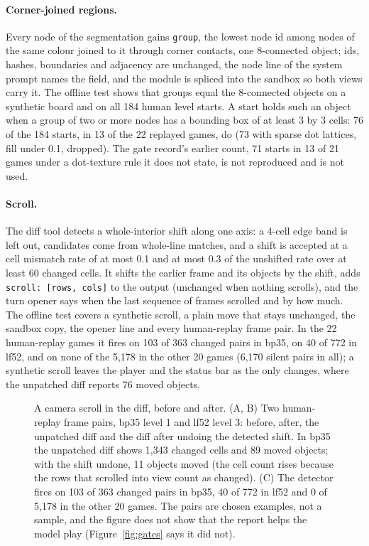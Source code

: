 \paragraph{Corner-joined regions.}
Every node of the segmentation gains \texttt{group}, the lowest node id among nodes of the same colour joined to it through corner contacts, one 8-connected object; ids, hashes, boundaries and adjacency are unchanged, the node line of the system prompt names the field, and the module is spliced into the sandbox so both views carry it. %
The offline test shows that groups equal the 8-connected objects on a synthetic board and on all 184 human level starts. %
A start holds such an object when a group of two or more nodes has a bounding box of at least 3 by 3 cells: 76 of the 184 starts, in 13 of the 22 replayed games, do (73 with sparse dot lattices, fill under 0.1, dropped). The gate record's earlier count, 71 starts in 13 of 21 games under a dot-texture rule it does not state, is not reproduced and is not used. %

\paragraph{Scroll.}
The diff tool detects a whole-interior shift along one axis: a 4-cell edge band is left out, candidates come from whole-line matches, and a shift is accepted at a cell mismatch rate of at most 0.1 and at most 0.3 of the unshifted rate over at least 60 changed cells. %
It shifts the earlier frame and its objects by the shift, adds \texttt{scroll: [rows, cols]} to the output (unchanged when nothing scrolls), and the turn opener says when the last sequence of frames scrolled and by how much. %
The offline test covers a synthetic scroll, a plain move that stays unchanged, the sandbox copy, the opener line and every human-replay frame pair. %
In the 22 human-replay games it fires on 103 of 363 changed pairs in bp35, on 40 of 772 in lf52, and on none of the 5,178 in the other 20 games (6,170 silent pairs in all); a synthetic scroll leaves the player and the status bar as the only changes, where the unpatched diff reports 76 moved objects. %

\begin{figure}[!htb]
\centering
{}
\caption{A camera scroll in the diff, before and after. (A, B) Two human-replay frame pairs, bp35 level 1 and lf52 level 3: before, after, the unpatched diff and the diff after undoing the detected shift. In bp35 the unpatched diff shows 1,343 changed cells and 89 moved objects; with the shift undone, 11 objects moved (the cell count rises because the rows that scrolled into view count as changed). (C) The detector fires on 103 of 363 changed pairs in bp35, 40 of 772 in lf52 and 0 of 5,178 in the other 20 games. The pairs are chosen examples, not a sample, and the figure does not show that the report helps the model play (Figure~\ref{fig:gates} says it did not).}\label{fig:scroll} %
\end{figure}

